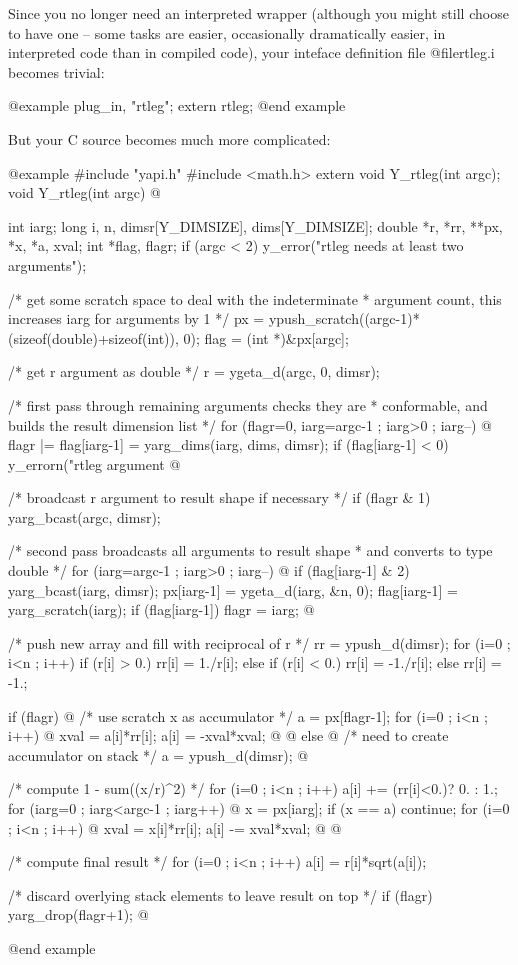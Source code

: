 Since you no longer need an interpreted wrapper (although you might
still choose to have one -- some tasks are easier, occasionally
dramatically easier, in interpreted code than in compiled code), your
inteface definition file @file{rtleg.i} becomes trivial:

@example
plug_in, "rtleg";
extern rtleg;
@end example

But your C source becomes much more complicated:

@example
#include "yapi.h"
#include <math.h>
extern void Y_rtleg(int argc);
void
Y_rtleg(int argc)
@{
  int iarg;
  long i, n, dimsr[Y_DIMSIZE], dims[Y_DIMSIZE];
  double *r, *rr, **px, *x, *a, xval;
  int *flag, flagr;
  if (argc < 2) y_error("rtleg needs at least two arguments");

  /* get some scratch space to deal with the indeterminate
   * argument count, this increases iarg for arguments by 1
   */
  px = ypush_scratch((argc-1)*(sizeof(double)+sizeof(int)), 0);
  flag = (int *)&px[argc];

  /* get r argument as double */
  r = ygeta_d(argc, 0, dimsr);

  /* first pass through remaining arguments checks they are
   * conformable, and builds the result dimension list
   */
  for (flagr=0, iarg=argc-1 ; iarg>0 ; iarg--) @{
    flagr |= flag[iarg-1] = yarg_dims(iarg, dims, dimsr);
    if (flag[iarg-1] < 0)
      y_errorn("rtleg argument %
  @}

  /* broadcast r argument to result shape if necessary */
  if (flagr & 1) yarg_bcast(argc, dimsr);

  /* second pass broadcasts all arguments to result shape
   * and converts to type double
   */
  for (iarg=argc-1 ; iarg>0 ; iarg--) @{
    if (flag[iarg-1] & 2) yarg_bcast(iarg, dimsr);
    px[iarg-1] = ygeta_d(iarg, &n, 0);
    flag[iarg-1] = yarg_scratch(iarg);
    if (flag[iarg-1]) flagr = iarg;
  @}

  /* push new array and fill with reciprocal of r */
  rr = ypush_d(dimsr);
  for (i=0 ; i<n ; i++)
    if (r[i] > 0.) rr[i] = 1./r[i];
    else if (r[i] < 0.) rr[i] = -1./r[i];
    else rr[i] = -1.;

  if (flagr) @{  /* use scratch x as accumulator */
    a = px[flagr-1];
    for (i=0 ; i<n ; i++) @{
      xval = a[i]*rr[i];
      a[i] = -xval*xval;
    @}
  @} else @{      /* need to create accumulator on stack */
    a = ypush_d(dimsr);
  @}

  /* compute 1 - sum((x/r)^2) */
  for (i=0 ; i<n ; i++) a[i] += (rr[i]<0.)? 0. : 1.;
  for (iarg=0 ; iarg<argc-1 ; iarg++) @{
    x = px[iarg];
    if (x == a) continue;
    for (i=0 ; i<n ; i++) @{
      xval = x[i]*rr[i];
      a[i] -= xval*xval;
    @}
  @}

  /* compute final result */
  for (i=0 ; i<n ; i++) a[i] = r[i]*sqrt(a[i]);

  /* discard overlying stack elements to leave result on top */
  if (flagr) yarg_drop(flagr+1);
@}
@end example

